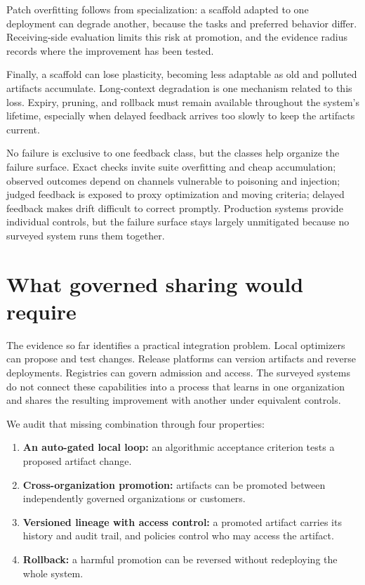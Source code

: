 \documentclass[
  11pt,
]{article}
\providecommand{\tightlist}{%
  \setlength{\itemsep}{0pt}\setlength{\parskip}{0pt}}
\begin{document}
Patch overfitting follows from specialization: a scaffold adapted to one deployment can degrade another, because the tasks and preferred behavior differ. Receiving-side evaluation limits this risk at promotion, and the evidence radius records where the improvement has been tested.

Finally, a scaffold can lose plasticity, becoming less adaptable as old and polluted artifacts accumulate. Long-context degradation \cite{liu2023lostmiddle} is one mechanism related to this loss. Expiry, pruning, and rollback must remain available throughout the system's lifetime, especially when delayed feedback arrives too slowly to keep the artifacts current.

No failure is exclusive to one feedback class, but the classes help organize the failure surface. Exact checks invite suite overfitting and cheap accumulation; observed outcomes depend on channels vulnerable to poisoning and injection; judged feedback is exposed to proxy optimization and moving criteria; delayed feedback makes drift difficult to correct promptly. Production systems provide individual controls, but the failure surface stays largely unmitigated because no surveyed system runs them together.

\section{What governed sharing would require}\label{sec:gap}

The evidence so far identifies a practical integration problem. Local optimizers can propose and test changes. Release platforms can version artifacts and reverse deployments. Registries can govern admission and access. The surveyed systems do not connect these capabilities into a process that learns in one organization and shares the resulting improvement with another under equivalent controls.

We audit that missing combination through four properties:

\begin{enumerate}
\def\labelenumi{(\alph{enumi})}
\tightlist
\item
  \textbf{An auto-gated local loop:} an algorithmic acceptance criterion tests a proposed artifact change.
\item
  \textbf{Cross-organization promotion:} artifacts can be promoted between independently governed organizations or customers.
\item
  \textbf{Versioned lineage with access control:} a promoted artifact carries its history and audit trail, and policies control who may access the artifact.
\item
  \textbf{Rollback:} a harmful promotion can be reversed without redeploying the whole system.
\end{enumerate}
\end{document}
